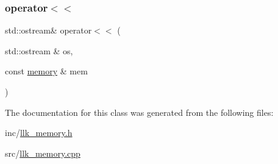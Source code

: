 \subsubsection{\texorpdfstring{operator$<$$<$}{operator<<}}
{\footnotesize\ttfamily std\+::ostream\& operator$<$$<$ (\begin{DoxyParamCaption}\item[{std\+::ostream \&}]{os,  }\item[{const \hyperlink{classllk_1_1memory}{memory} \&}]{mem }\end{DoxyParamCaption})\hspace{0.3cm}{\ttfamily [friend]}}



The documentation for this class was generated from the following files\+:\begin{DoxyCompactItemize}
\item 
inc/\hyperlink{llk__memory_8h}{llk\+\_\+memory.\+h}\item 
src/\hyperlink{llk__memory_8cpp}{llk\+\_\+memory.\+cpp}\end{DoxyCompactItemize}
